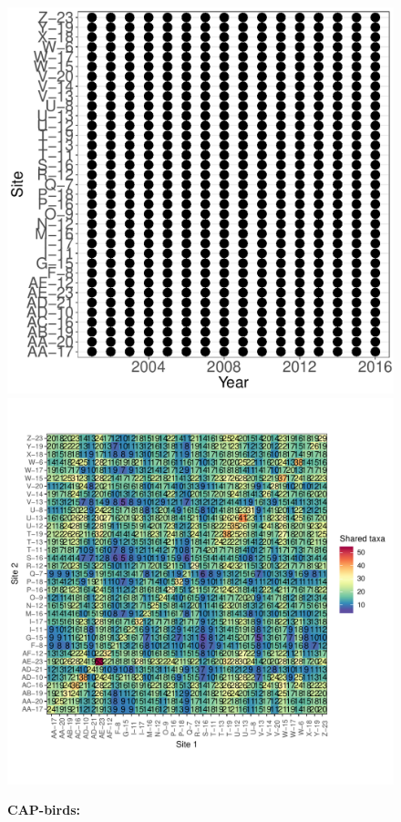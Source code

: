 \documentclass[11pt, oneside]{article}
\begin{document}
\begin{figure}[h!]
\includegraphics[scale = 0.4]{cap-birds-banville_spatiotemporal_sampling_effort.pdf}
\includegraphics[scale = 0.4]{cap-birds-banville_spp_shared.pdf}
\caption{{\bf CAP-birds:} }
\label{cap-birds}
\end{figure}





\renewcommand{\refname}{\subsection*{References}}

\end{document}
